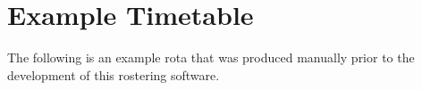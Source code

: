 \chapter{Example Timetable}
\label{Example Timetable}

The following is an example rota that was produced manually prior to the development of this rostering software.

